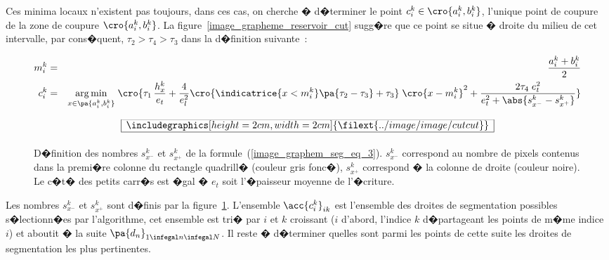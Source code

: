 Ces minima locaux n'existent pas toujours, dans ces cas, on cherche � d�terminer le point $c_i^k \in \cro{a_i^k, b_i^k}$, l'unique point de coupure de la zone de coupure $\cro{a_i^k, b_i^k}$. La figure~\ref{image_grapheme_reservoir_cut} sugg�re que ce point se situe � droite du milieu de cet intervalle, par cons�quent, $\tau_2 > \tau_4 > \tau_3$ dans la d�finition suivante~:

            \begin{eqnarray}
            m_i^k    &=&                    \frac{a_i^k + b_i^k}{2} \nonumber \\
            c^k_i &=&               \underset{x \in \pa{a_i^k, b_i^k}}{\arg \min} \; \cro {
                                                \tau_1     \, \frac{h_x^k}{e_t}  + 
                                                \frac{4}{e_l^2}    \cro{ \indicatrice{x < m_i^k} 
                                                                                                \pa{\tau_2 - \tau_3} + \tau_3}  \;
                                                                                  \cro{x - m_i^k}^2  +
                                                \frac{2 \tau_4 \; e_t^2}{e_t^2 + \abs{s_{x^-}^k - s_{x^+}^k} }
                                                }
            \label{image_graphem_seg_eq_3}
            \end{eqnarray}
            



            \begin{figure}[ht]
        $$\frame{$\begin{array}[c]{c}\includegraphics[height=2cm, width=2cm]
        {\filext{../image/image/cutcut}}\end{array}$}$$
        \caption{    D�finition des nombres $s_{x^-}^k$ et $s_{x^+}^k$ de la 
                            formule~(\ref{image_graphem_seg_eq_3}). $s_{x^-}^k$ correspond au nombre de pixels contenus
                            dans la premi�re colonne du rectangle quadrill� (couleur gris fonc�), $s_{x^+}^k$ correspond
                            � la colonne de droite (couleur noire). Le c�t� des petits carr�s est �gal � $e_t$ soit
                            l'�paisseur moyenne de l'�criture.
                            }
        \label{image_graphem_aire_cut}
            \end{figure}



Les nombres $s_{x^-}^k$ et $s_{x^+}^k$ sont d�finis par la figure~\ref{image_graphem_aire_cut}. L'ensemble $\acc{c^k_i}_{ik}$ est l'ensemble des droites de segmentation possibles s�lectionn�es par l'algorithme, cet ensemble est tri� par $i$ et $k$ croissant ($i$ d'abord, l'indice $k$ d�partageant les points de m�me indice $i$) et aboutit � la suite $\pa{d_n}_{ 1 \infegal n \infegal N }$. Il reste � d�terminer quelles sont parmi les points de cette suite les droites de segmentation les plus pertinentes.


